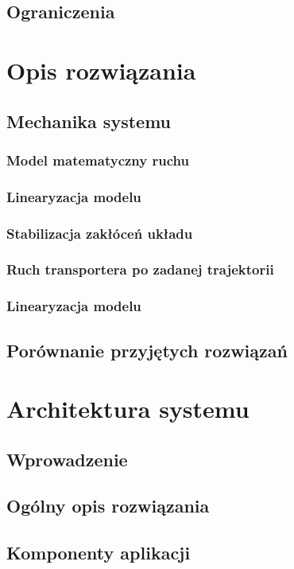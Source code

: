 \documentclass[12pt, oneside]{report}
\theoremstyle{definition}
\begin{document}
\section{Ograniczenia}


\newpage
\chapter{Opis rozwiązania}
\section{Mechanika systemu}
\subsection{Model matematyczny ruchu}
\subsection{Linearyzacja modelu}
\subsection{Stabilizacja zakłóceń układu}
\subsection{Ruch transportera po zadanej trajektorii}
\subsection{Linearyzacja modelu}
\section{Porównanie przyjętych rozwiązań}


\chapter{Architektura systemu}
\section{Wprowadzenie}
\section{Ogólny opis rozwiązania}
\section{Komponenty aplikacji}
\end{document}
